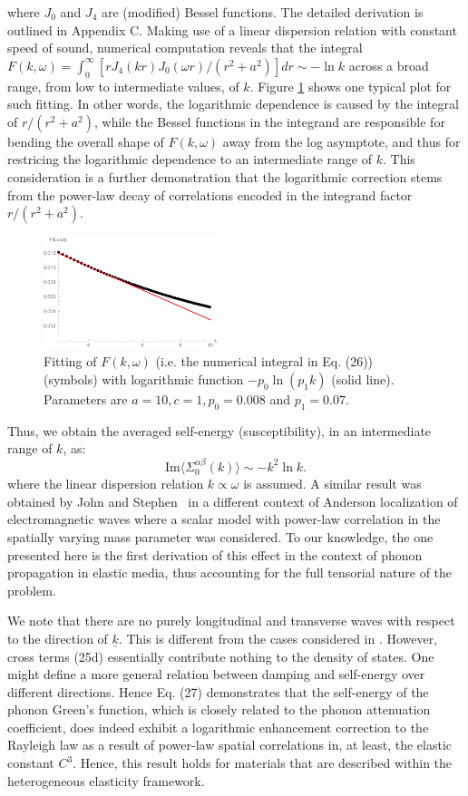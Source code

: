 \documentclass[twoside,twocolumn,9pt]{article}
\begin{document}
where $J_0$ and $J_4$ are (modified) Bessel functions. The detailed derivation is outlined in Appendix C. Making use of a linear dispersion relation with constant speed of sound, numerical computation reveals that the integral $F(k,\omega)=\int_0^\infty [rJ_4(kr)J_0(\omega r)/(r^2+a^2)]dr\sim-\ln k$ across a broad range, from low to intermediate values, of $k$. Figure \ref{fig:logfit} shows one typical plot for such fitting. In other words, the logarithmic dependence is caused by the integral of $r/(r^{2} + a^{2})$, while the Bessel functions in the integrand are responsible for bending the overall shape of $F(k,\omega)$ away from the log asymptote, and thus for restricing the logarithmic dependence to an intermediate range of $k$. This consideration is a further demonstration that the logarithmic correction stems from the power-law decay of correlations encoded in the integrand factor $r/(r^{2} + a^{2})$.
\begin{figure}
\centering
\includegraphics[width=0.45\textwidth]{log}
\caption{Fitting of $F(k,\omega)$ (i.e. the numerical integral in Eq. (26)) (symbols) with logarithmic function $-p_0\ln(p_1k)$ (solid line). Parameters are $a=10, c=1, p_0=0.008$ and $p_1=0.07$.}
\label{fig:logfit}
\end{figure}
Thus, we obtain the averaged self-energy (susceptibility), in an intermediate range of $k$, as:
\begin{equation}
\text{Im}\langle\Sigma_0^{\alpha\beta}(k)\rangle\sim-k^2\ln k.
\end{equation}
where the linear dispersion relation $k\propto\omega$ is assumed.
A similar result was obtained by John and Stephen~\cite{John1983b} in a different context of Anderson localization of electromagnetic waves where a scalar model with power-law correlation in the spatially varying mass parameter was considered. To our knowledge, the one presented here is the first derivation of this effect in the context of phonon propagation in elastic media, thus accounting for the full tensorial nature of the problem.

We note that there are no purely longitudinal and transverse waves with respect to the direction of $\underline{k}$. This is different from the cases considered in \cite{Maurer2004,John1983a,John1983b}. However, cross terms (25d) essentially contribute nothing to the density of states. One might define a more general relation between damping and self-energy over different directions.
Hence Eq. (27) demonstrates that the self-energy of the phonon Green's function, which is closely related to the phonon attenuation coefficient, does indeed exhibit a logarithmic enhancement correction to the Rayleigh law as a result of power-law spatial correlations in, at least, the elastic constant $C^{3}$. Hence, this result holds for materials that are described within the heterogeneous elasticity framework.
\end{document}
